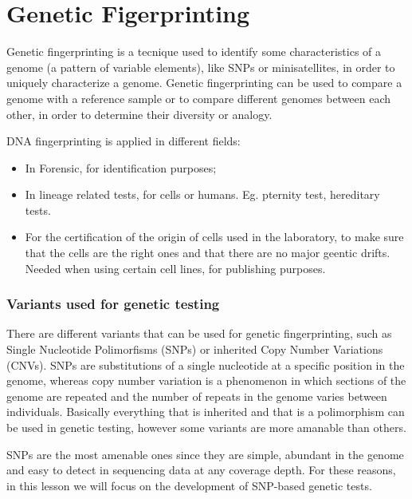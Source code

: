 \graphicspath{{chapters/GeneticFingImages/}}
\chapter{Genetic Figerprinting}

Genetic fingerprinting is a tecnique used to identify some characteristics of a genome (a pattern of variable elements), like SNPs or minisatellites, in order to uniquely characterize a genome. Genetic fingerprinting can be used to compare a genome with a reference sample or to compare different genomes between each other, in order to determine their diversity or analogy. 

DNA fingerprinting is applied in different fields:

\begin{itemize}
	\item In Forensic, for identification purposes;
	\item In lineage related tests, for cells or humans. Eg. pternity test, hereditary tests.
	\item For the certification of the origin of cells used in the laboratory, to make sure that the cells are the right ones and that there are no major geentic drifts. Needed when using certain cell lines, for publishing purposes.
\end{itemize}


\subsection{Variants used for genetic testing}

There are different variants that can be used for genetic fingerprinting, such as Single Nucleotide Polimorfisms (SNPs) or inherited Copy Number Variations (CNVs).
SNPs are substitutions of a single nucleotide at a specific position in the genome, whereas copy number variation is a phenomenon in which sections of the genome are repeated and the number of repeats in the genome varies between individuals.
Basically everything that is inherited and that is a polimorphism can be used in genetic testing, however some variants are more amanable than others.


SNPs are the most amenable ones since they are simple, abundant in the genome and easy to detect in sequencing data at any coverage depth. For these reasons, in this lesson we will focus on the development of SNP-based genetic tests.

